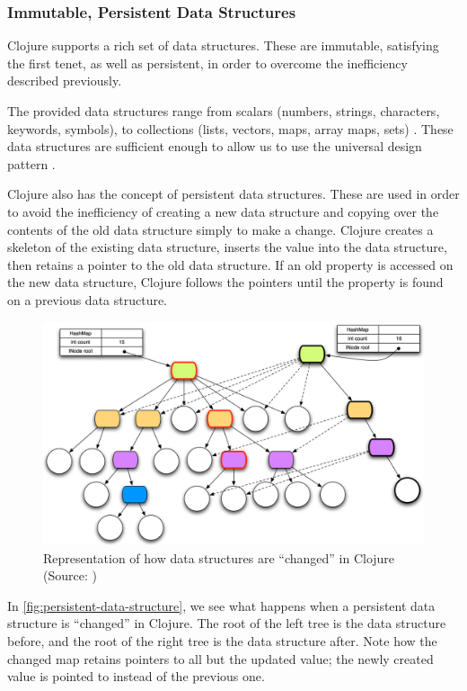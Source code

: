 		\subsubsection{Immutable, Persistent Data Structures}
			Clojure supports a rich set of data structures.  These are immutable, satisfying the first tenet, as well as persistent, in order to overcome the inefficiency described previously.
			
			The provided data structures range from scalars (numbers, strings, characters, keywords, symbols), to collections (lists, vectors, maps, array maps, sets) \cite{clj-data-structures}.  These data structures are sufficient enough to allow us to use the universal design pattern \cite{udp-08}.
			
			Clojure also has the concept of persistent data structures.  These are used in order to avoid the inefficiency of creating a new data structure and copying over the contents of the old data structure simply to make a change.  Clojure creates a skeleton of the existing data structure, inserts the value into the data structure, then retains a pointer to the old data structure.  If an old property is accessed on the new data structure, Clojure follows the pointers until the property is found on a previous data structure.
			
			\begin{figure}
				\centering
				
				\includegraphics[scale=0.42]{figures/diagrams/persistent-data-structure}
				
				\caption{Representation of how data structures are ``changed'' in Clojure (Source:  \cite{clj-persistent})}
				\label{fig:persistent-data-structure}
			\end{figure}
			
			In \vref{fig:persistent-data-structure}, we see what happens when a persistent data structure is ``changed'' in Clojure.  The root of the left tree is the data structure before, and the root of the right tree is the data structure after.  Note how the changed map retains pointers to all but the updated value; the newly created value is pointed to instead of the previous one.
		
